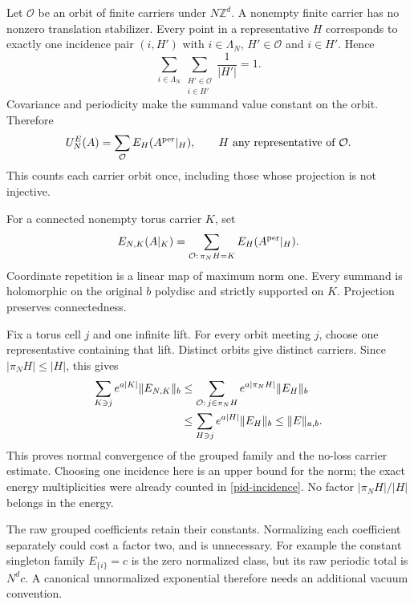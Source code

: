 \documentclass[11pt]{article}
\theoremstyle{remark}
\begin{document}
Let $\mathcal O$ be an orbit of finite carriers under
$N\mathbb Z^d$. A nonempty finite carrier has no nonzero
translation stabilizer. Every point in a representative $H$
corresponds to exactly one incidence pair $(i,H')$ with
$i\in\Lambda_N$, $H'\in\mathcal O$ and $i\in H'$. Hence
\begin{equation}
 \sum_{i\in\Lambda_N}\sum_{\substack{H'\in\mathcal O\\ i\in H'}}
                      \frac1{|H'|}=1.
 \label{pid-incidence}
\end{equation}
Covariance and periodicity make the summand value constant on
the orbit. Therefore
\begin{equation}
 U_N^E(A)=\sum_{\mathcal O}E_H(A^{\rm per}|_H),
                   \qquad H\text{ any representative of }\mathcal O.
 \label{pid-orbit-sum}
\end{equation}
This counts each carrier orbit once, including those whose
projection is not injective.

For a connected nonempty torus carrier $K$, set
\begin{equation}
 E_{N,K}(A|_K)=
       \sum_{\mathcal O:\,\pi_NH=K}E_H(A^{\rm per}|_H).
 \label{pid-grouped-family}
\end{equation}
Coordinate repetition is a linear map of maximum norm one.
Every summand is holomorphic on the original $b$ polydisc and
strictly supported on $K$. Projection preserves connectedness.

Fix a torus cell $j$ and one infinite lift. For every orbit
meeting $j$, choose one representative containing that lift.
Distinct orbits give distinct carriers. Since
$|\pi_NH|\le|H|$, this gives
\begin{align}
 \sum_{K\ni j}e^{a|K|}\|E_{N,K}\|_b
 &\le\sum_{\mathcal O:\,j\in\pi_NH}
                         e^{a|\pi_NH|}\|E_H\|_b\notag\\
 &\le\sum_{H\ni j}e^{a|H|}\|E_H\|_b
 \le\|E\|_{a,b}.
 \label{pid-wrapped-bound}
\end{align}
This proves normal convergence of the grouped family and the
no-loss carrier estimate. Choosing one incidence here is an
upper bound for the norm; the exact energy multiplicities were
already counted in \eqref{pid-incidence}. No factor
$|\pi_NH|/|H|$ belongs in the energy.

The raw grouped coefficients retain their constants. Normalizing
each coefficient separately could cost a factor two, and is
unnecessary. For example the constant singleton family
$E_{\{i\}}=c$ is the zero normalized class, but its raw periodic
total is $N^dc$. A canonical unnormalized exponential therefore
needs an additional vacuum convention.
\end{document}
